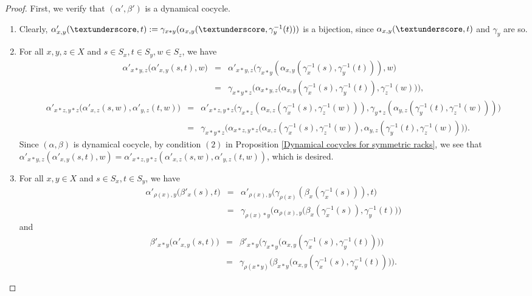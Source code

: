\documentclass[11pt,reqno]{amsart}
\theoremstyle{definition}
\numberwithin{equation}{subsection}
\begin{document}
\begin{proof}
	First, we verify that $(\alpha',\beta')$ is a dynamical cocycle.
	\begin{enumerate}
		\item Clearly, $\alpha'_{x,y}(\textunderscore,t):= \gamma_{x*y}(\alpha_{x,y}(\textunderscore,\gamma_y^{-1}(t)))$ is a bijection, since $\alpha_{x,y}(\textunderscore,t)$ and $\gamma_y$ are so.
\item For all $x,y,z \in X$ and $s\in S_x,t \in S_y, w\in S_z $, we have
\begin{eqnarray*}
\alpha'_{x*y,z} \big(\alpha'_{x,y}(s,t),w \big)&=&\alpha'_{x*y,z} \big(\gamma_{x*y}(\alpha_{x,y}(\gamma_x^{-1}(s),\gamma_y^{-1}(t))),w \big)\\
&=&\gamma_{x*y*z} \big(\alpha_{x*y,z} \big(\alpha_{x,y}(\gamma_x^{-1}(s),\gamma_y^{-1}(t)),\gamma_z^{-1}(w) \big) \big),
\end{eqnarray*}
\begin{eqnarray*}
\alpha'_{x*z,y*z} \big(\alpha'_{x,z}(s,w),\alpha'_{y,z}(t,w) \big)&=& 	\alpha'_{x*z,y*z}\big(\gamma_{x*z}(\alpha_{x,z}(\gamma_x^{-1}(s),\gamma_z^{-1}(w))),\gamma_{y*z}(\alpha_{y,z}(\gamma_y^{-1}(t),\gamma_z^{-1}(w))) \big)\\
		&=&\gamma_{x*y*z} \big(\alpha_{x*z,y*z} \big(\alpha_{x,z}(\gamma_x^{-1}(s),\gamma_z^{-1}(w)),\alpha_{y,z}(\gamma_y^{-1}(t),\gamma_z^{-1}(w)) \big)\big).
	\end{eqnarray*}
Since $(\alpha,\beta)$ is dynamical cocycle, by condition $(2)$ in Proposition \ref{Dynamical cocycles for symmetric racks}, we see that $\alpha'_{x*y,z}(\alpha'_{x,y}(s,t),w)=\alpha'_{x*z,y*z}(\alpha'_{x,z}(s,w),\alpha'_{y,z}(t,w))$, which is desired.
\item For all $x,y \in X$ and $s\in S_x,t \in S_y $, we have
\begin{eqnarray*}	
	\alpha'_{\rho(x),y} \big(\beta'_x(s),t \big)&=&\alpha'_{\rho(x),y} \big(\gamma_{\rho(x)}(\beta_x(\gamma_x^{-1}(s))),t \big)\\
	&=&\gamma_{\rho(x)*y} \big(\alpha_{\rho(x),y} \big(\beta_x(\gamma_x^{-1}(s)),\gamma_y^{-1}(t) \big) \big)
\end{eqnarray*}	
and
\begin{eqnarray*}	
	\beta'_{x*y} \big(\alpha'_{x,y}(s,t) \big)&=&\beta'_{x*y} \big(\gamma_{x*y}\big(\alpha_{x,y}(\gamma_x^{-1}(s),\gamma_y^{-1}(t)) \big) \big)\\
	&=&\gamma_{\rho(x*y)} \big(\beta_{x*y}\big(\alpha_{x,y}(\gamma_x^{-1}(s),\gamma_y^{-1}(t))\big)\big).
\end{eqnarray*}

\end{enumerate}
\end{proof}
\end{document}

